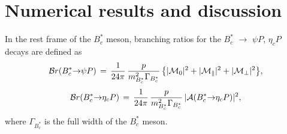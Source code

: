 \documentclass[preprint,superscriptaddress,nofootinbib]{revtex4}
\begin{document}
  \section{Numerical results and discussion}
  \label{sec03}
  In the rest frame of the $B_{c}^{\ast}$ meson, branching ratios
  for the $B_{c}^{\ast}$ ${\to}$ ${\psi}P$, ${\eta}_{c}P$ decays are
  defined as
   \begin{equation}
  {\cal B}r(B_{c}^{\ast}{\to}{\psi}P)\, =\, \frac{1}{24{\pi}}\,
   \frac{p}{m_{B_{c}^{\ast}}^{2}{\Gamma}_{B_{c}^{\ast}}}\,
   \big\{ {\vert}{\cal M}_{0}{\vert}^{2}
  + {\vert}{\cal M}_{\parallel}{\vert}^{2}
  + {\vert}{\cal M}_{\perp}{\vert}^{2}  \big\}
   \label{br01},
   \end{equation}
   \begin{equation}
  {\cal B}r(B_{c}^{\ast}{\to}{\eta}_{c}P)\, =\, \frac{1}{24{\pi}}\,
   \frac{p}{m_{B_{c}^{\ast}}^{2}{\Gamma}_{B_{c}^{\ast}}}\,
  {\vert}{\cal A}(B_{c}^{\ast}{\to}{\eta}_{c}P){\vert}^{2}
   \label{br02},
   \end{equation}
  where ${\Gamma}_{B_{c}^{\ast}}$ is the full width of
  the $B_{c}^{\ast}$ meson.
\end{document}
